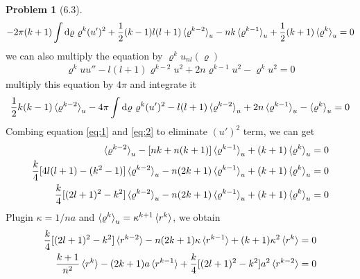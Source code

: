 \documentclass[twoside,11pt]{article}
\renewcommand*\d{\mathop{}\!\mathrm{d}}
\theoremstyle{definition}
\newtheorem{problem}{Problem}
\theoremstyle{remark}
\begin{document}
\begin{problem}[6.3]
\begin{align}
    -2\pi (k+1)\int\d\varrho\ \varrho^k (u')^2 + \frac{1}{2}(k-1)l(l+1)\braket{\varrho^{k-2}}_u
    - nk\braket{\varrho^{k-1}}_u + \frac{1}{2}(k+1)\braket{\varrho^k}_u = 0
    \label{eq:1}
\end{align}
we can also multiply the equation by $\varrho^k u_{nl}(\varrho)$
\begin{align*}
    \varrho^kuu'' - l(l+1)\varrho^{k-2}u^2 + 2n\varrho^{k-1}u^2 - \varrho^k u^2 = 0
\end{align*}
multiply this equation by $4\pi$ and integrate it
\begin{align}
    \frac{1}{2}k(k-1)\braket{\varrho^{k-2}}_u -4\pi\int\d\varrho\ \varrho^k (u')^2
    - l(l+1)\braket{\varrho^{k-2}}_u + 2n\braket{\varrho^{k-1}}_u
    - \braket{\varrho^k}_u = 0
    \label{eq:2}
\end{align}
Combing equation \ref{eq:1} and \ref{eq:2} to eliminate $(u')^2$ term, we can get
\begin{align*}
    [\frac{1}{2}(k-1)l(l+1) - \frac{1}{4}k(k^2-1)+\frac{1}{2}l(l+1)(k+1)]\braket{\varrho^{k-2}}_u 
    - [nk+n(k+1)]\braket{\varrho^{k-1}}_u + (k+1)\braket{\varrho^k}_u &= 0\\
    \frac{k}{4}[4l(l+1)-(k^2-1)]\braket{\varrho^{k-2}}_u - n(2k+1)\braket{\varrho^{k-1}}_u
    +(k+1)\braket{\varrho^k}_u &= 0\\
    \frac{k}{4}[(2l+1)^2 - k^2]\braket{\varrho^{k-2}}_u - n(2k+1)\braket{\varrho^{k-1}}_u
    + (k+1)\braket{\varrho^k}_u &= 0
\end{align*}
Plugin $\kappa = 1/na$ and $\braket{\varrho^k}_u = \kappa^{k+1}\braket{r^k}$, we obtain
\begin{align*}
    \frac{k}{4}[(2l+1)^2 - k^2]\braket{r^{k-2}} - n(2k+1)\kappa\braket{r^{k-1}}
    + (k+1)\kappa^2\braket{r^k} &= 0\\
    \frac{k+1}{n^2}\braket{r^k} - (2k+1)a\braket{r^{k-1}} + \frac{k}{4}[(2l+1)^2 - k^2]a^2\braket{r^{k-2}}
    &= 0
\end{align*}


\end{problem}
\end{document}
